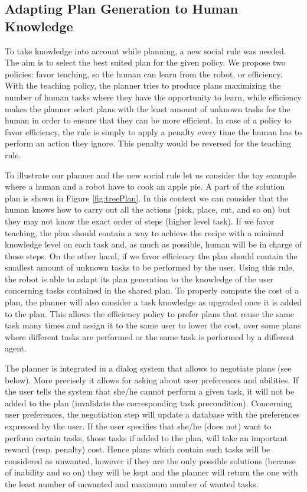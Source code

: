 \subsection{Adapting Plan Generation to Human Knowledge}
To take knowledge into account while planning, a new social rule was needed. The aim is to select the best suited plan for the given policy. We propose two policies: favor teaching, so the human can learn from the robot, or efficiency. With the teaching policy, the planner tries to produce plans maximizing the number of human tasks where they have the opportunity to learn, while efficiency makes the planner select plans with the least amount of unknown tasks for the human in order to ensure that they can be more efficient.
In case of a policy to favor efficiency, the rule is simply to apply a penalty every time the human has to perform an action they ignore. This penalty would be reversed for the teaching rule.

To illustrate our planner and the new social rule let us consider the toy example where a human and a robot have to cook an apple pie. A part of the solution plan is shown in Figure \ref{fig:treePlan}. In this context we can consider that the human knows how to carry out all the actions (pick, place, cut, and so on) but they may not know the exact order of steps (higher level task). If we favor teaching, the plan should contain a way to achieve the recipe with a minimal knowledge level on each task and, as much as possible, human will be in charge of those steps. On the other hand, if we favor efficiency the plan should contain the smallest amount of unknown tasks to be performed by the user.
Using this rule, the robot is able to adapt its plan generation to the knowledge of the user concerning tasks contained in the shared plan.
To properly compute the cost of a plan, the planner will also consider a task knowledge as upgraded once it is added to the plan. This allows the efficiency policy to prefer plans that reuse the same task many times and assign it to the same user to lower the cost, over some plans where different tasks are performed or the same task is performed by a different agent.

The planner is integrated in a dialog system that allows to negotiate plans (see below). More precisely it allows for asking about user preferences and abilities. If the user tells the system that she/he cannot perform a given task, it will not be added to the plan (invalidate the corresponding task precondition).
Concerning user preferences, the negotiation step will update a database with the preferences expressed by the user. If the user specifies that she/he (does not) want to perform certain tasks, those tasks if added to the plan, will take an important reward (resp. penalty) cost. Hence plans which contain such tasks will be considered as unwanted, however if they are the only possible solutions (because of inability and so on) they will be kept and the planner will return the one with the least number of unwanted and maximum number of wanted tasks.


